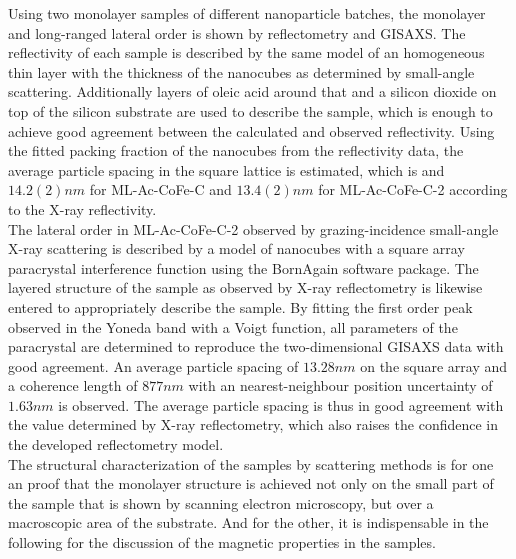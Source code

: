 \documentclass[\main/dresen_thesis.tex]{subfiles}
\begin{document}
  \label{sec:monolayers:structuralCharacterization:summary}
  Using two monolayer samples of different nanoparticle batches, the monolayer and long-ranged lateral order is shown by reflectometry and GISAXS.
  The reflectivity of each sample is described by the same model of an homogeneous thin layer with the thickness of the nanocubes as determined by small-angle scattering.
  Additionally layers of oleic acid around that and a silicon dioxide on top of the silicon substrate are used to describe the sample, which is enough to achieve good agreement between the calculated and observed reflectivity.
  Using the fitted packing fraction of the nanocubes from the reflectivity data, the average particle spacing in the square lattice is estimated, which is and $14.2(2) \unit{nm}$ for ML-Ac-CoFe-C and $13.4(2) \unit{nm}$ for ML-Ac-CoFe-C-2 according to the X-ray reflectivity.
  \\

  The lateral order in ML-Ac-CoFe-C-2 observed by grazing-incidence small-angle X-ray scattering is described by a model of nanocubes with a square array paracrystal interference function using the BornAgain software package.
  The layered structure of the sample as observed by X-ray reflectometry is likewise entered to appropriately describe the sample.
  By fitting the first order peak observed in the Yoneda band with a Voigt function, all parameters of the paracrystal are determined to reproduce the two-dimensional GISAXS data with good agreement.
  An average particle spacing of $13.28 \unit{nm}$ on the square array and a coherence length of $877 \unit{nm}$ with an nearest-neighbour position uncertainty of $1.63 \unit{nm}$ is observed.
  The average particle spacing is thus in good agreement with the value determined by X-ray reflectometry, which also raises the confidence in the developed reflectometry model.
  \\

  The structural characterization of the samples by scattering methods is for one an proof that the monolayer structure is achieved not only on the small part of the sample that is shown by scanning electron microscopy, but over a macroscopic area of the substrate.
  And for the other, it is indispensable in the following for the discussion of the magnetic properties in the samples.
\end{document}
